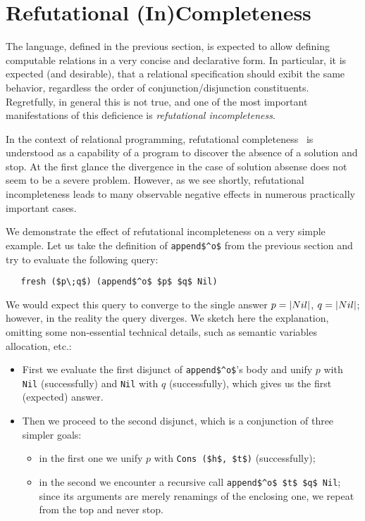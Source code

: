 \section{Refutational (In)Completeness}
\label{incompleteness}

The language, defined in the previous section, is expected to allow defining computable relations in a 
very concise and declarative form. In particular, it is expected (and desirable), that a relational 
specification should exibit the same behavior, regardless the order of conjunction/disjunction 
constituents. Regretfully, in general this is not true, and one of the most important
manifestations of this deficience is \emph{refutational incompleteness}.  

In the context of relational programming, refutational completeness~\cite{WillThesis} is understood as 
a capability of a program to discover the absence of a solution and stop. At the first glance
the divergence in the case of solution absense does not seem to be a severe problem. However, as
we see shortly, refutational incompleteness leads to many observable negative effects in numerous
practically important cases. 

We demonstrate the effect of refutational incompleteness on a very simple example. Let us take the
definition of \lstinline{append$^o$} from the previous section and try to evaluate the following query:

\begin{lstlisting}
   fresh ($p\;q$) (append$^o$ $p$ $q$ Nil)
\end{lstlisting}

We would expect this query to converge to the single answer \mbox{$p=\lstinline|Nil|$}, \mbox{$q=\lstinline|Nil|$};
however, in the reality the query diverges. We sketch here the explanation, omitting some non-essential technical
details, such as semantic variables allocation, etc.:

\begin{itemize}
\item First we evaluate the first disjunct of \lstinline|append$^o$|'s body and unify $p$ with \lstinline|Nil| (successfully)
and \lstinline|Nil| with $q$ (successfully), which gives us the first (expected) answer.

\item Then we proceed to the second disjunct, which is a conjunction of three simpler goals:

  \begin{itemize} 
     \item in the first one we unify $p$ with \lstinline|Cons ($h$, $t$)| (successfully);
     \item in the second we encounter a recursive call \lstinline|append$^o$ $t$ $q$ Nil|; since its arguments are merely renamings of the enclosing one, we repeat from the top and never stop.
  \end{itemize} 
\end{itemize}

